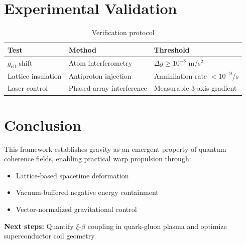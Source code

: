 \documentclass{article}
\begin{document}
\section{Experimental Validation}
\begin{table}[h]
\centering
\caption{Verification protocol}
\begin{tabular}{@{}lll@{}}
\toprule
\textbf{Test} & \textbf{Method} & \textbf{Threshold} \\
\midrule
$g_{\text{eff}}$ shift & Atom interferometry & $\Delta g \geq 10^{-8}$ m/s$^2$ \\
Lattice insulation & Antiproton injection & Annihilation rate $< 10^{-9}$/s \\
Laser control & Phased-array interference & Measurable 3-axis gradient \\
\bottomrule
\end{tabular}
\end{table}

\section*{Conclusion}
This framework establishes gravity as an emergent property of quantum coherence fields, enabling practical warp propulsion through:\\[10pt]
\renewcommand{\labelitemi}{$\triangleright$}
\begin{itemize}
\item Lattice-based spacetime deformation
\item Vacuum-buffered negative energy containment
\item Vector-normalized gravitational control\\[10pt]
\end{itemize}
\textbf{Next steps:} Quantify $\xi$-$\beta$ coupling in quark-gluon plasma and optimize superconductor coil geometry.
\end{document}
